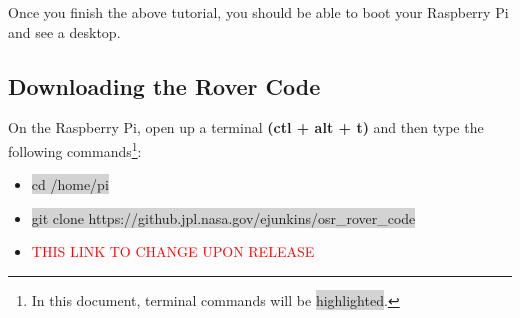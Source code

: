 \documentclass[12pt]{article}
\begin{document}
Once you finish the above tutorial, you should be able to boot your Raspberry Pi and see a desktop.

\subsection{Downloading the Rover Code}
On the Raspberry Pi, open up a terminal \textbf{(ctl + alt + t)} and then type the following commands\footnote{In this document, terminal commands will be \colorbox{lightgray}{highlighted}.}:

\begin{itemize}
	\item[] \colorbox{lightgray}{cd /home/pi}
	\item[] \colorbox{lightgray}{git clone https://github.jpl.nasa.gov/ejunkins/osr\_rover\_code}
	\item[] \textcolor{red}{THIS LINK TO CHANGE UPON RELEASE}
\end{itemize}

%
%
%
\end{document}
